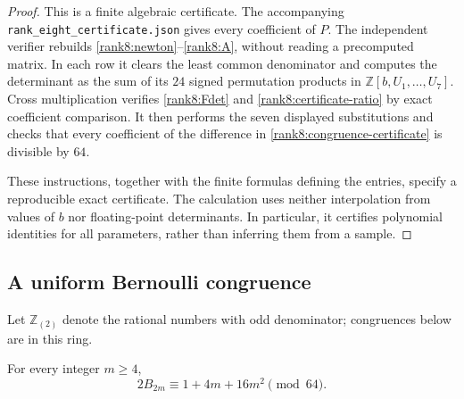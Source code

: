 \begin{proof}
This is a finite algebraic certificate. The accompanying
\texttt{rank\_eight\_certificate.json} gives
every coefficient of $P$.  The independent verifier rebuilds
\eqref{rank8:newton}--\eqref{rank8:A}, without reading a precomputed
matrix.  In each row it clears the least common denominator and
computes the determinant as the sum of its $24$ signed permutation
products in $\mathbb Z[b,U_1,\ldots,U_7]$.  Cross multiplication
verifies \eqref{rank8:Fdet} and \eqref{rank8:certificate-ratio} by
exact coefficient comparison.  It then performs the seven displayed
substitutions and checks that every coefficient of the difference in
\eqref{rank8:congruence-certificate} is divisible by $64$.

These instructions, together with the finite formulas defining the
entries, specify a reproducible exact certificate.  The calculation
uses neither interpolation from values of $b$ nor floating-point
determinants.  In particular, it certifies polynomial identities for
all parameters, rather than inferring them from a sample.
\end{proof}

\subsection{A uniform Bernoulli congruence}

Let $\mathbb Z_{(2)}$ denote the rational numbers with odd
denominator; congruences below are in this ring.

\begin{lemma}
\label{rank8:bernoulli}
For every integer $m\ge4$,
\begin{equation}\label{rank8:bernoulli64}
 \boxed{2B_{2m}\equiv1+4m+16m^2\pmod {64}.}
\end{equation}
\end{lemma}

